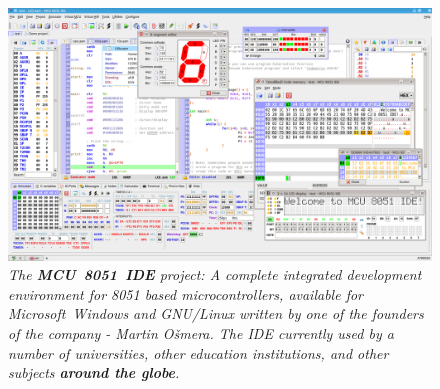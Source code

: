 \documentclass[a4paper,twoside,15pt]{book}
\begin{document}
        \begin{figure}[h!]
            \centering{}
            \includegraphics[width=.9\textwidth]{images/mcu8051ide_0.png}
            \caption{\textit{The \textbf{MCU~8051~IDE} project: A complete integrated development environment for 8051 based microcontrollers, available for Microsoft\textregistered{}~Windows\textregistered{} and GNU/Linux\textregistered{} written by one of the founders of the company - Martin Ošmera. The IDE currently used by a number of universities, other education institutions, and other subjects \textbf{around the globe}.}}
        \end{figure}
\end{document}
